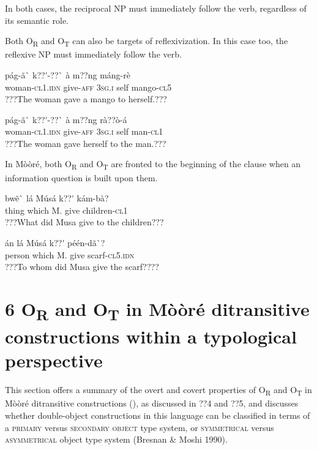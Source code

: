 \documentclass[output=paper]{langsci/langscibook}
\begin{document}
In both cases, the reciprocal NP must immediately follow the verb, regardless of its semantic role. 

Both O\textsubscript{R }and O\textsubscript{T} can also be targets of reflexivization. In this case too, the reflexive NP must immediately follow the verb.


\ea \gll 
pág-ã\`{ }      k??\'{ }-??\`{ }    à    m??ng  máng-rè
\\
%
woman-\textsc{cl1.idn}  give-\textsc{aff}  \textsc{3sg.i  }  self  mango-\textsc{cl5}
\\\glt
???The woman gave a mango to herself.???
\z


\ea \gll 
pág-ã\`{ }      k??\'{ }-??\`{ }        à    m??ng  rà??ò-á
\\
%
woman-\textsc{cl1.idn}  give-\textsc{aff}  \textsc{3sg.i  }  self  man-\textsc{cl1}
\\\glt
???The woman gave herself to the man.???
\z


In Mòòré, both O\textsubscript{R} and O\textsubscript{T} are fronted to the beginning of the clause when an information question is built upon them. 


\ea \gll 
bwẽ\`{ }    lá    Músá  k??\'{ }  kám-bà?
\\
%
thing    which    M.  give  children-\textsc{cl1}
\\\glt
???What did Musa give to the children???
\z


\ea \gll 
án    lá    Músá  k??\'{ }  péén-dã\`{ }?
\\
%
person  which    M.  give  scarf-\textsc{cl5.idn}
\\\glt
???To whom did Musa give the scarf????
\z

\section[6 OR and OT in Mo\`{ }o\`{ }re\'{ } ditransitive constructions within a typological perspective]{6 O\textsubscript{R} and O\textsubscript{T} in Mòòré ditransitive constructions within a typological perspective}

This section offers a summary of the overt and covert properties of O\textsubscript{R} and O\textsubscript{T} in Mòòré ditransitive constructions (), as discussed in ??4 and ??5, and discusses whether double-object constructions in this language can be classified in terms of a \textsc{primary} versus \textsc{secondary object }\citep{Dryer1986} type system, or \textsc{symmetrical} versus \textsc{asymmetrical} object type system (Bresnan \& Moshi 1990).
\end{document}
